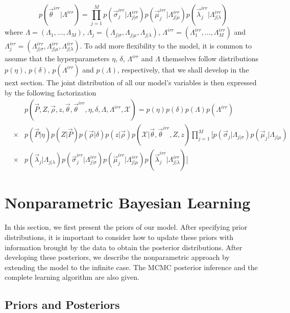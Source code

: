 \documentclass[journal,10pt]{elsart}
\begin{document}
\begin{equation}
p(\vec{\theta}^{irr}|\Lambda^{irr})=\prod_{j=1}^M p(\vec{\sigma}_j^{irr}|\Lambda_{j|\sigma}^{irr})p(\vec{\mu}_{j}^{irr}|\Lambda_{j|\mu}^{irr})p(\vec{\lambda}_j^{irr}|\Lambda_{j|\lambda}^{irr})
\end{equation}
where $\Lambda=(\Lambda_1,\ldots,\Lambda_M)$, $\Lambda_j=(\Lambda_{j|\sigma},\Lambda_{j|\mu},\Lambda_{j|\lambda})$, $\Lambda^{irr}=(\Lambda_1^{irr},\ldots,\Lambda_M^{irr})$ and $\Lambda_j^{irr}=(\Lambda_{j|\sigma}^{irr},\Lambda_{j|\mu}^{irr},\Lambda_{j|\lambda}^{irr})$. To add more flexibility to the model, it is common to assume that the hyperparameters $\eta$, $\delta$, $\Lambda^{irr}$ and $\Lambda$ themselves follow distributions $p(\eta)$, $p(\delta)$, $p(\Lambda^{irr})$ and $p(\Lambda)$, respectively, that we shall develop in the next section. The joint distribution of all our model's variables is then expressed by the following factorization
\begin{eqnarray}\label{finaljoint}
 &&p(\vec{P},Z,\vec{\rho},z,\vec{\theta},\vec{\theta}^{irr},\eta,\delta,\Lambda,\Lambda^{irr},\mathcal{X})=
p(\eta)p(\delta)p(\Lambda)p(\Lambda^{irr})\\\nonumber
&\times&p(\vec{P}|\eta)p(Z|\vec{P})p(\vec{\rho}|\delta)p(z|\vec{\rho})p(\mathcal{X}|\vec{\theta},\vec{\theta}^{irr},Z,z)\prod_{j=1}^M\bigg[ p(\vec{\sigma}_j|\Lambda_{j|\sigma})p(\vec{\mu}_{j}|\Lambda_{j|\mu})\\\nonumber &\times&p(\vec{\lambda}_j|\Lambda_{j|\lambda})p(\vec{\sigma}_j^{irr}|\Lambda_{j|\sigma}^{irr})p(\vec{\mu}_{j}^{irr}|\Lambda_{j|\mu}^{irr})p(\vec{\lambda}_j^{irr}|\Lambda_{j|\lambda}^{irr})\bigg]
\end{eqnarray}
\section{Nonparametric Bayesian Learning}
In this section, we first present the priors of our model. After specifying prior distributions, it is important to consider how to update these priors with information brought by the data to obtain the posterior distributions. After developing these posteriors, we describe the nonparametric approach by extending the model to the infinite case. The MCMC posterior inference and the complete learning algorithm are also given.
\subsection{Priors and Posteriors}
\end{document}
